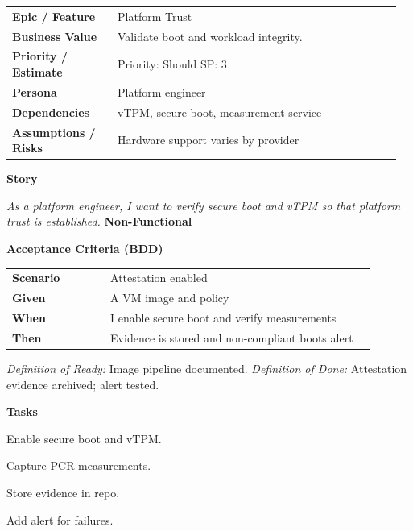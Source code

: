 \documentclass[11pt,letterpaper]{article}
\makeatletter
\newenvironment{kvtable}{%
  \begin{tabular}{@{}>{\bfseries\arraybackslash}p{0.26\linewidth} p{0.70\linewidth}@{}}
}{\end{tabular}}
\newenvironment{bdd}{%
  \begin{tabular}{@{}>{\bfseries\arraybackslash}p{0.26\linewidth} p{0.70\linewidth}@{}}
}{\end{tabular}}
\newcommand{\DoRDoD}[2]{%
  \vspace{0.35em}
  {\footnotesize\color{Muted}%
    \textit{Definition of Ready:} #1 \; \textbullet\;
    \textit{Definition of Done:} #2%
  }%
}
\newenvironment{storycard}[2]{%
  \begin{tcolorbox}[cloudcard, title={#1 --- #2}]%
}{\end{tcolorbox}}
\newcommand{\sectionlabel}[1]{\vspace{0.35em}\textbf{#1}\par}
\makeatother
\begin{document}
\begin{storycard}{CCS-24}{Ch. 24 — Trusted Computing Technology}
\begin{kvtable}
Epic / Feature & Platform Trust\\
Business Value & Validate boot and workload integrity.\\
Priority / Estimate & Priority: Should \quad SP: 3\\
Persona & Platform engineer\\
Dependencies & vTPM, secure boot, measurement service\\
Assumptions / Risks & Hardware support varies by provider\\
\end{kvtable}
\sectionlabel{Story}
\textit{As a platform engineer, I want to verify secure boot and vTPM so that platform trust is established.}
\sectionlabel{Non-Functional}\;
\sectionlabel{Acceptance Criteria (BDD)}
\begin{bdd}
Scenario & Attestation enabled\\
Given & A VM image and policy\\
When & I enable secure boot and verify measurements\\
Then & Evidence is stored and non-compliant boots alert\\
\end{bdd}
\DoRDoD{Image pipeline documented.}{Attestation evidence archived; alert tested.}
\sectionlabel{Tasks}
\begin{checklist}
\item Enable secure boot and vTPM.
\item Capture PCR measurements.
\item Store evidence in repo.
\item Add alert for failures.
\end{checklist}
\end{storycard}
\end{document}
